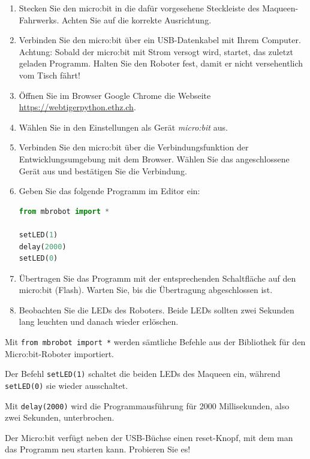 \begin{enumerate}
    \item Stecken Sie den micro:bit in die dafür vorgesehene
          Steckleiste des Maqueen-Fahrwerks. Achten Sie
          auf die korrekte Ausrichtung.

    \item Verbinden Sie den micro:bit über ein USB-Datenkabel
          mit Ihrem Computer. Achtung: Sobald der micro:bit mit Strom versogt wird, startet, das zuletzt geladen Programm. Halten Sie den Roboter fest, damit er nicht versehentlich vom Tisch fährt!

    \item Öffnen Sie im Browser Google Chrome die Webseite
          \url{https://webtigerpython.ethz.ch}.

    \item Wählen Sie in den Einstellungen als Gerät
          \emph{micro:bit} aus.

    \item Verbinden Sie den micro:bit über die
          Verbindungsfunktion der Entwicklungsumgebung
          mit dem Browser. Wählen Sie das angeschlossene
          Gerät aus und bestätigen Sie die Verbindung.

    \item Geben Sie das folgende Programm im Editor ein:

          \begin{lstlisting}[language=Python]
from mbrobot import *

setLED(1)
delay(2000)
setLED(0)
\end{lstlisting}

    \item Übertragen Sie das Programm mit der entsprechenden
          Schaltfläche auf den micro:bit (Flash).
          Warten Sie, bis die Übertragung abgeschlossen ist.

    \item Beobachten Sie die LEDs des Roboters.
          Beide LEDs sollten zwei Sekunden lang leuchten
          und danach wieder erlöschen.
\end{enumerate}

\begin{myremark}
    Mit \texttt{from mbrobot import *} werden sämtliche Befehle aus der Bibliothek für den Micro:bit-Roboter importiert.

    Der Befehl \texttt{setLED(1)} schaltet die beiden
    LEDs des Maqueen ein, während \texttt{setLED(0)}
    sie wieder ausschaltet.

    Mit \texttt{delay(2000)} wird die Programmausführung
    für 2000 Millisekunden, also zwei Sekunden, unterbrochen.

    Der Micro:bit verfügt neben der USB-Büchse einen reset-Knopf, mit dem man das Programm neu starten kann. Probieren Sie es!
\end{myremark}



















